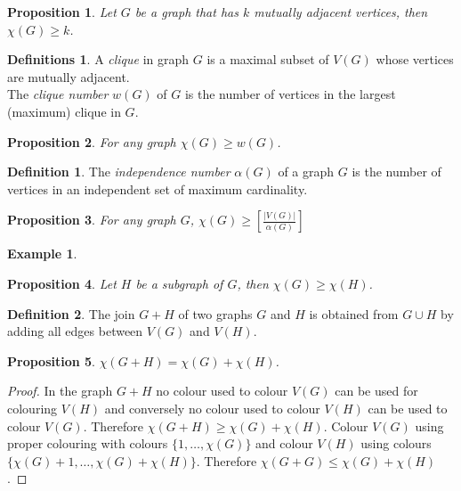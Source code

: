 \documentclass{article}
\newtheorem*{prop}{Proposition}
\theoremstyle{definition}
\newtheorem*{defn}{Definition}
\newtheorem*{defns}{Definitions}
\newtheorem*{ex}{Example}
\begin{document}
\begin{prop}
Let $G$ be a graph that has $k$ mutually adjacent vertices, then $\chi(G) \ge k$.
\end{prop}

\begin{defns}
A \emph{clique} in graph $G$ is a maximal subset of $V(G)$ whose vertices are mutually adjacent. \\
The \emph{clique number} $w(G)$ of $G$ is the number of vertices in the largest (maximum) clique in $G$.
\end{defns}

\begin{prop}
For any graph $\chi(G) \ge w(G)$.
\end{prop}

\begin{defn}
The \emph{independence number} $\alpha(G)$ of a graph $G$ is the number of vertices in an independent set of maximum cardinality.
\end{defn}

\begin{prop}
For any graph $G$, $\chi(G) \ge \left[ \frac{|V(G)|}{\alpha(G)}\right]$
\end{prop}

\begin{ex}
\end{ex}

\begin{prop}
Let $H$ be a subgraph of $G$, then $\chi(G) \ge \chi(H)$.
\end{prop}

\begin{defn}
The join $G+H$ of two graphs $G$ and $H$ is obtained from $G\cup H$ by adding all edges between $V(G)$ and $V(H)$.
\end{defn}

\begin{prop}
$\chi(G+H) = \chi(G) + \chi(H)$.
\end{prop}

\begin{proof}
In the graph $G+H$ no colour used to colour $V(G)$ can be used for colouring $V(H)$ and conversely no colour used to colour $V(H)$ can be used to colour $V(G)$.
Therefore $\chi(G+H) \ge \chi(G) + \chi(H)$.
Colour $V(G)$ using proper colouring with colours $\{1,\ldots,\chi(G)\}$ and colour $V(H)$ using colours $\{\chi(G) + 1,\ldots, \chi(G) + \chi(H)\}$.
Therefore $\chi(G+G) \le \chi(G)  + \chi(H) $.
\end{proof}
\end{document}
